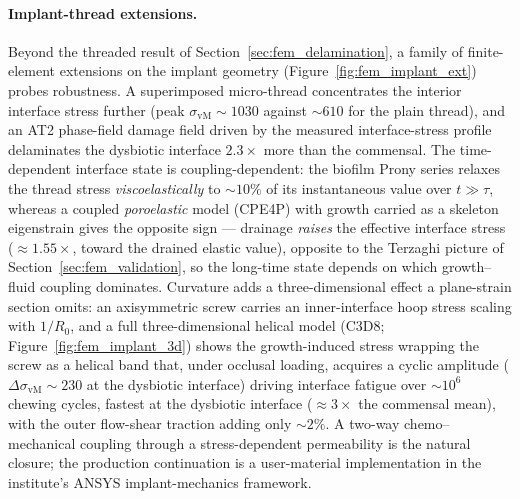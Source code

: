 \paragraph{Implant-thread extensions.} Beyond the threaded result of
Section~\ref{sec:fem_delamination}, a family of finite-element extensions on the implant
geometry (Figure~\ref{fig:fem_implant_ext}) probes robustness. A superimposed micro-thread
concentrates the interior interface stress further (peak $\sigma_\mathrm{vM}\!\sim\!1030$ against
$\sim\!610$ for the plain thread), and an AT2 phase-field damage field driven by the measured
interface-stress profile delaminates the dysbiotic interface $2.3\times$ more than the commensal.
The time-dependent interface state is coupling-dependent: the biofilm Prony series relaxes the
thread stress \emph{viscoelastically} to $\sim\!10\%$ of its instantaneous value over $t\gg\tau$,
whereas a coupled \emph{poroelastic} model (CPE4P) with growth carried as a skeleton eigenstrain
gives the opposite sign --- drainage \emph{raises} the effective interface stress ($\approx\!1.55\times$,
toward the drained elastic value), opposite to the Terzaghi picture of
Section~\ref{sec:fem_validation}, so the long-time state depends on which growth--fluid coupling
dominates. Curvature adds a three-dimensional effect a plane-strain section omits: an axisymmetric
screw carries an inner-interface hoop stress scaling with $1/R_0$, and a full three-dimensional
helical model (C3D8; Figure~\ref{fig:fem_implant_3d}) shows the growth-induced stress wrapping the
screw as a helical band that, under occlusal loading, acquires a cyclic amplitude
($\Delta\sigma_\mathrm{vM}\!\sim\!230$ at the dysbiotic interface) driving interface fatigue over
$\sim\!10^6$ chewing cycles, fastest at the dysbiotic interface ($\approx\!3\times$ the commensal mean),
with the outer flow-shear traction adding only $\sim\!2\%$. A two-way chemo--mechanical coupling through
a stress-dependent permeability is the natural closure; the production continuation is a user-material
implementation in the institute's ANSYS implant-mechanics framework.

